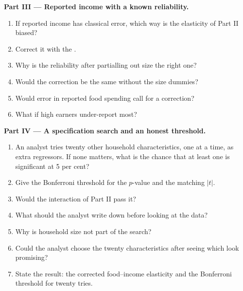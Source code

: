 \begin{problem}
\medskip
\noindent\textbf{Part III --- Reported income with a known reliability.}
\begin{enumerate}[resume]
  \item If reported income has classical error, which way is the elasticity of Part II biased?
  \item Correct it with the .
  \item Why is the reliability after partialling out size the right one?
  \item Would the correction be the same without the size dummies?
  \item Would error in reported food spending call for a correction?
  \item What if high earners under-report most?
\end{enumerate}

\medskip
\noindent\textbf{Part IV --- A specification search and an honest threshold.}
\begin{enumerate}[resume]
  \item An analyst tries twenty other household characteristics, one at a time, as extra regressors. If none matters, what
  is the chance that at least one is significant at 5 per cent?
  \item Give the Bonferroni threshold for the $p$-value and the matching $|t|$.
  \item Would the interaction of Part II pass it?
  \item What should the analyst write down before looking at the data?
  \item Why is household size not part of the search?
  \item Could the analyst choose the twenty characteristics after seeing which look promising?
  \item State the result: the corrected food--income elasticity and the Bonferroni threshold for twenty tries.
\end{enumerate}
\end{problem}
